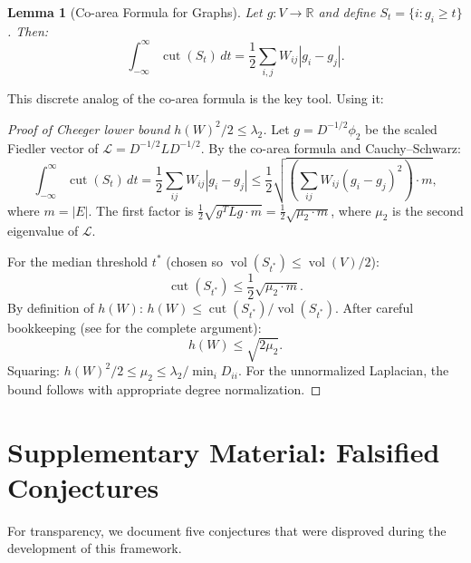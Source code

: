 \documentclass[12pt,letterpaper]{article}
\newtheorem{lemma}[theorem]{Lemma}
\newcommand{\R}{\mathbb{R}}
\newcommand{\vol}{\operatorname{vol}}
\newcommand{\cut}{\operatorname{cut}}
\begin{document}
\begin{lemma}[Co-area Formula for Graphs]
\label{lem:coarea}
Let $g : V \to \R$ and define $S_t = \{i : g_i \geq t\}$. Then:
\[
  \int_{-\infty}^{\infty} \cut(S_t) \, dt = \frac{1}{2}\sum_{i,j} W_{ij} |g_i - g_j|.
\]
\end{lemma}

This discrete analog of the co-area formula \citep{federer1969} is the key tool. Using it:

\begin{proof}[Proof of Cheeger lower bound $h(W)^2/2 \leq \lambda_2$]
Let $g = D^{-1/2} \phi_2$ be the scaled Fiedler vector of $\mathcal{L} = D^{-1/2} L D^{-1/2}$. By the co-area formula and Cauchy--Schwarz:
\[
  \int_{-\infty}^{\infty} \cut(S_t) \, dt = \frac{1}{2}\sum_{ij} W_{ij}|g_i - g_j| \leq \frac{1}{2}\sqrt{\left(\sum_{ij} W_{ij}(g_i - g_j)^2\right) \cdot m},
\]
where $m = |E|$. The first factor is $\frac{1}{2}\sqrt{g^T L g \cdot m} = \frac{1}{2}\sqrt{\mu_2 \cdot m}$, where $\mu_2$ is the second eigenvalue of $\mathcal{L}$.

For the median threshold $t^*$ (chosen so $\vol(S_{t^*}) \leq \vol(V)/2$):
\[
  \cut(S_{t^*}) \leq \frac{1}{2}\sqrt{\mu_2 \cdot m}.
\]
By definition of $h(W)$: $h(W) \leq \cut(S_{t^*})/\vol(S_{t^*})$. After careful bookkeeping (see \cite[Ch.~2, Thm.~2.2]{chung1997} for the complete argument):
\[
  h(W) \leq \sqrt{2\mu_2}.
\]
Squaring: $h(W)^2/2 \leq \mu_2 \leq \lambda_2 / \min_i D_{ii}$. For the unnormalized Laplacian, the bound follows with appropriate degree normalization.
\end{proof}

\section{Supplementary Material: Falsified Conjectures}
\label{app:falsified}

For transparency, we document five conjectures that were disproved during the development of this framework.
\end{document}
